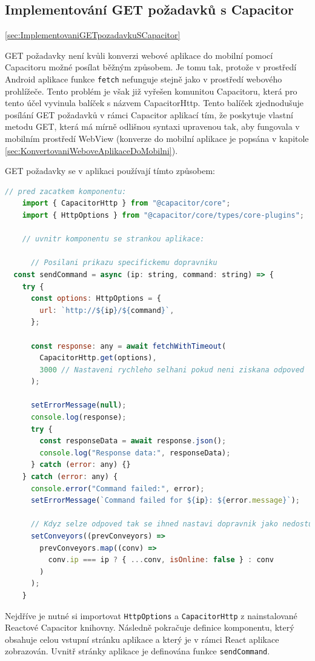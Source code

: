 \subsection{Implementování GET požadavků s Capacitor}\ref{sec:ImplementovaniGETpozadavkuSCapacitor}

GET požadavky není kvůli konverzi webové aplikace do mobilní pomocí Capacitoru možné posílat běžným způsobem. Je tomu tak, protože v prostředí Android aplikace funkce \texttt{fetch} nefunguje stejně jako v prostředí webového prohlížeče. Tento problém je však již vyřešen komunitou Capacitoru, která pro tento účel vyvinula balíček s názvem CapacitorHttp. Tento balíček zjednodušuje posílání GET požadavků v rámci Capacitor aplikací tím, že poskytuje vlastní metodu GET, která má mírně odlišnou syntaxi upravenou tak, aby fungovala v mobilním prostředí WebView (konverze do mobilní aplikace je popsána v kapitole \ref{sec:KonvertovaniWeboveAplikaceDoMobilni}).

GET požadavky se v aplikaci používají tímto způsobem:
\begin{lstlisting}[language=JavaScript, caption={Rozšířený způsob posílání GET požadavků pro Capacitor mobilní aplikace}, label={lst:SendCommandFunkce}]
    // pred zacatkem komponentu:
    import { CapacitorHttp } from "@capacitor/core";
    import { HttpOptions } from "@capacitor/core/types/core-plugins";

    // uvnitr komponentu se strankou aplikace:

      // Posilani prikazu specifickemu dopravniku
  const sendCommand = async (ip: string, command: string) => {
    try {
      const options: HttpOptions = {
        url: `http://${ip}/${command}`,
      };

      const response: any = await fetchWithTimeout(
        CapacitorHttp.get(options),
        3000 // Nastaveni rychleho selhani pokud neni ziskana odpoved
      );

      setErrorMessage(null);
      console.log(response);
      try {
        const responseData = await response.json();
        console.log("Response data:", responseData);
      } catch (error: any) {}
    } catch (error: any) {
      console.error("Command failed:", error);
      setErrorMessage(`Command failed for ${ip}: ${error.message}`);

      // Kdyz selze odpoved tak se ihned nastavi dopravnik jako nedostupny
      setConveyors((prevConveyors) =>
        prevConveyors.map((conv) =>
          conv.ip === ip ? { ...conv, isOnline: false } : conv
        )
      );
    }
\end{lstlisting}
Nejdříve je nutné si importovat \texttt{HttpOptions} a \texttt{CapacitorHttp} z nainstalované Reactové Capacitor knihovny. Následně pokračuje definice komponentu, který obsahuje celou vstupní stránku aplikace a který je v rámci React aplikace zobrazován. Uvnitř stránky aplikace je definována funkce \texttt{sendCommand}.


